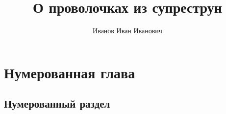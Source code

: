 \documentclass[a4paper,10pt]{report}
\title{О проволочках из супреструн}
\author{Иванов Иван Иванович}
\begin{document}
  \maketitle
  \chapter{Нумерованная глава}
  \label{c:num_chap}
  \section{Нумерованный раздел}
\end{document}
